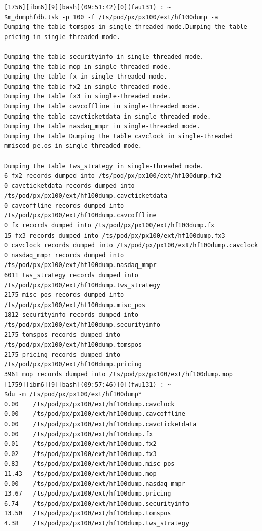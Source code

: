 \documentclass[8pt,]{article}
\begin{document}
\begin{verbatim}
[1756][ibm6][9][bash](09:51:42)[0](fwu131) : ~
$m_dumphfdb.tsk -p 100 -f /ts/pod/px/px100/ext/hf100dump -a
Dumping the table tomspos in single-threaded mode.Dumping the table pricing in single-threaded mode.

Dumping the table securityinfo in single-threaded mode.
Dumping the table mop in single-threaded mode.
Dumping the table fx in single-threaded mode.
Dumping the table fx2 in single-threaded mode.
Dumping the table fx3 in single-threaded mode.
Dumping the table cavcoffline in single-threaded mode.
Dumping the table cavcticketdata in single-threaded mode.
Dumping the table nasdaq_mmpr in single-threaded mode.
Dumping the table Dumping the table cavclock in single-threaded mmiscod_pe.os in single-threaded mode.

Dumping the table tws_strategy in single-threaded mode.
6 fx2 records dumped into /ts/pod/px/px100/ext/hf100dump.fx2
0 cavcticketdata records dumped into /ts/pod/px/px100/ext/hf100dump.cavcticketdata
0 cavcoffline records dumped into /ts/pod/px/px100/ext/hf100dump.cavcoffline
0 fx records dumped into /ts/pod/px/px100/ext/hf100dump.fx
15 fx3 records dumped into /ts/pod/px/px100/ext/hf100dump.fx3
0 cavclock records dumped into /ts/pod/px/px100/ext/hf100dump.cavclock
0 nasdaq_mmpr records dumped into /ts/pod/px/px100/ext/hf100dump.nasdaq_mmpr
6011 tws_strategy records dumped into /ts/pod/px/px100/ext/hf100dump.tws_strategy
2175 misc_pos records dumped into /ts/pod/px/px100/ext/hf100dump.misc_pos
1812 securityinfo records dumped into /ts/pod/px/px100/ext/hf100dump.securityinfo
2175 tomspos records dumped into /ts/pod/px/px100/ext/hf100dump.tomspos
2175 pricing records dumped into /ts/pod/px/px100/ext/hf100dump.pricing
3961 mop records dumped into /ts/pod/px/px100/ext/hf100dump.mop
[1759][ibm6][9][bash](09:57:46)[0](fwu131) : ~
$du -m /ts/pod/px/px100/ext/hf100dump*
0.00    /ts/pod/px/px100/ext/hf100dump.cavclock
0.00    /ts/pod/px/px100/ext/hf100dump.cavcoffline
0.00    /ts/pod/px/px100/ext/hf100dump.cavcticketdata
0.00    /ts/pod/px/px100/ext/hf100dump.fx
0.01    /ts/pod/px/px100/ext/hf100dump.fx2
0.02    /ts/pod/px/px100/ext/hf100dump.fx3
0.83    /ts/pod/px/px100/ext/hf100dump.misc_pos
11.43   /ts/pod/px/px100/ext/hf100dump.mop
0.00    /ts/pod/px/px100/ext/hf100dump.nasdaq_mmpr
13.67   /ts/pod/px/px100/ext/hf100dump.pricing
6.74    /ts/pod/px/px100/ext/hf100dump.securityinfo
13.50   /ts/pod/px/px100/ext/hf100dump.tomspos
4.38    /ts/pod/px/px100/ext/hf100dump.tws_strategy
\end{verbatim}
\end{document}
